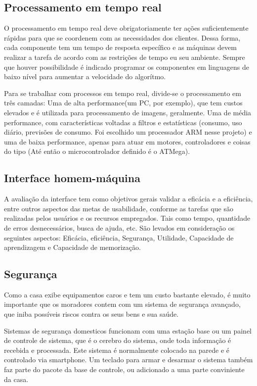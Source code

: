 \subsection{Processamento em tempo real}

	O processamento em tempo real deve obrigatoriamente ter ações suficientemente rápidas para que se coordenem com as necessidades dos clientes\cite{2014SiqueiraFraga}. Dessa forma, cada componente tem um tempo de resposta específico e as máquinas devem realizar a tarefa de acordo com as restrições de tempo eu seu ambiente\cite{brookshear2013ciencia}. Sempre que houver possibilidade é indicado programar os componentes em linguagens de baixo nível para aumentar a velocidade do algorítmo\cite{2014SiqueiraFraga2}.

	Para se trabalhar com processos em tempo real, divide-se o processamento em três camadas: Uma de alta performance(um PC, por exemplo), que tem custos elevados e é utilizada para processamento de imagens, geralmente. Uma de média performance, com características voltadas a filtros e estatísticas (consumo, uso diário, previsões de consumo. Foi escolhido um processador ARM nesse projeto) e uma de baixa performance, apenas para atuar em motores, controladores e coisas do tipo (Até então o microcontrolador definido é o ATMega).

\subsection{Interface homem-máquina}

	A avaliação da interface tem como objetivos gerais validar a eficácia e a eficiência, entre outros aspectos das metas de usabilidade, conforme as tarefas que são realizadas pelos usuários e os recursos empregados. Tais como tempo, quantidade de erros desnecessários, busca de ajuda, etc. São levados em consideração os seguintes aspectos: Eficácia, eficiência, Segurança, Utilidade, Capacidade de aprendizagem e Capacidade de memorização.

\subsection{Segurança}

	Como a casa exibe equipamentos caros e tem um custo bastante elevado, é muito importante que os moradores contem com um sistema de segurança avançado, que iniba possíveis riscos contra os seus bens e sua saúde.

	Sistemas de segurança domesticos funcionam com uma estação base ou um painel de controle de sistema, que é o cerebro do sistema, onde toda informação é recebida e processada.  Este sistema é normalmente colocado na parede e é controlado via smartphone. Um teclado para armar e desarmar o sistema também faz parte do pacote da base de controle, ou adicionado a uma parte conviniente da casa.

